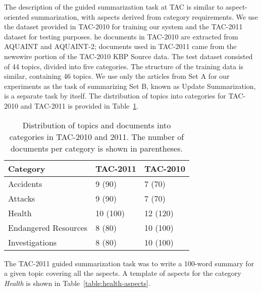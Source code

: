 The description of the guided summarization task at TAC is similar to aspect-oriented summarization, with aspects derived from category requirements.
We use the dataset provided in TAC-2010 for training our system and the TAC-2011 dataset for testing purposes.
he documents in TAC-2010 are extracted from AQUAINT and AQUAINT-2; documents used in TAC-2011 came from the newswire portion of the TAC-2010 KBP Source data. The test dataset consisted of 44 topics, divided into five categories.
The structure of the training data is similar, containing 46 topics. We use only the articles from Set A for our experiments as the task of summarizing Set B, known as Update Summarization, is a separate task by itself. The distribution of topics into categories for TAC-2010 and TAC-2011 is provided in Table~\ref{table:topic_categories}. 

\begin{table}[h]
\centering
\begin{tabular}{l||l|l}
 Category & TAC-2011 & TAC-2010  \\ \hline
 Accidents     & 9 (90)  & 7 (70)\\
 Attacks      & 9  (90) & 7 (70)\\
 Health  & 10 (100) & 12 (120) \\
 Endangered Resources & 8 (80) & 10  (100) \\
 Investigations     & 8 (80) & 10 (100)\\
\end{tabular}
\caption{Distribution of topics and documents into categories in TAC-2010 and 2011.  The number of documents per category is shown in parentheses.}
\label{table:topic_categories}
\end{table}

The TAC-2011 guided summarization task was to write a 100-word summary for a given topic covering all the aspects. A template of aspects for the category \emph{Health} is shown in Table~\ref{table:health-aspects}.

